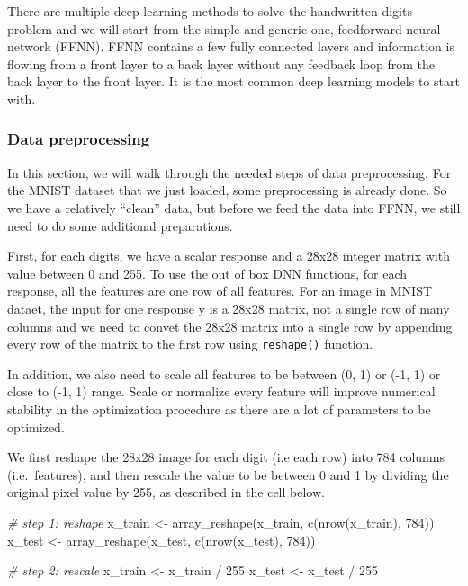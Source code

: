 \documentclass[
  12pt,
]{krantz}
\makeatletter
\newenvironment{Shaded}{\begin{snugshade}}{\end{snugshade}}
\newcommand{\CommentTok}[1]{\textcolor[rgb]{0.37,0.37,0.37}{\textit{#1}}}
\newcommand{\DecValTok}[1]{\textcolor[rgb]{0.06,0.06,0.06}{#1}}
\newcommand{\FunctionTok}[1]{\textcolor[rgb]{0,0,0}{#1}}
\newcommand{\NormalTok}[1]{#1}
\newcommand{\OtherTok}[1]{\textcolor[rgb]{0.37,0.37,0.37}{#1}}
\newcommand{\SpecialCharTok}[1]{\textcolor[rgb]{0,0,0}{#1}}
\newenvironment{kframe}{%
\medskip{}
\setlength{\fboxsep}{.8em}
 \def\at@end@of@kframe{}%
 \ifinner\ifhmode%
  \def\at@end@of@kframe{\end{minipage}}%
  \begin{minipage}{\columnwidth}%
 \fi\fi%
 \def\FrameCommand##1{\hskip\@totalleftmargin \hskip-\fboxsep
 \colorbox{shadecolor}{##1}\hskip-\fboxsep
     \hskip-\linewidth \hskip-\@totalleftmargin \hskip\columnwidth}%
 \MakeFramed {\advance\hsize-\width
   \@totalleftmargin\z@ \linewidth\hsize
   \@setminipage}}%
 {\par\unskip\endMakeFramed%
 \at@end@of@kframe}
\renewenvironment{Shaded}{\begin{kframe}}{\end{kframe}}
\makeatother
\begin{document}
There are multiple deep learning methods to solve the handwritten digits problem and we will start from the simple and generic one, feedforward neural network (FFNN). FFNN contains a few fully connected layers and information is flowing from a front layer to a back layer without any feedback loop from the back layer to the front layer. It is the most common deep learning models to start with.

\hypertarget{data-preprocessing}{%
\subsubsection{Data preprocessing}\label{data-preprocessing}}

In this section, we will walk through the needed steps of data preprocessing. For the MNIST dataset that we just loaded, some preprocessing is already done. So we have a relatively ``clean'' data, but before we feed the data into FFNN, we still need to do some additional preparations.

First, for each digits, we have a scalar response and a 28x28 integer matrix with value between 0 and 255. To use the out of box DNN functions, for each response, all the features are one row of all features. For an image in MNIST dataet, the input for one response y is a 28x28 matrix, not a single row of many columns and we need to convet the 28x28 matrix into a single row by appending every row of the matrix to the first row using \texttt{reshape()} function.

In addition, we also need to scale all features to be between (0, 1) or (-1, 1) or close to (-1, 1) range. Scale or normalize every feature will improve numerical stability in the optimization procedure as there are a lot of parameters to be optimized.

We first reshape the 28x28 image for each digit (i.e each row) into 784 columns (i.e.~features), and then rescale the value to be between 0 and 1 by dividing the original pixel value by 255, as described in the cell below.

\begin{Shaded}
\begin{Highlighting}[]
\CommentTok{\# step 1: reshape}
\NormalTok{x\_train }\OtherTok{\textless{}{-}} \FunctionTok{array\_reshape}\NormalTok{(x\_train,}
                         \FunctionTok{c}\NormalTok{(}\FunctionTok{nrow}\NormalTok{(x\_train), }\DecValTok{784}\NormalTok{))}
\NormalTok{x\_test }\OtherTok{\textless{}{-}} \FunctionTok{array\_reshape}\NormalTok{(x\_test,}
                        \FunctionTok{c}\NormalTok{(}\FunctionTok{nrow}\NormalTok{(x\_test), }\DecValTok{784}\NormalTok{))}

\CommentTok{\# step 2: rescale}
\NormalTok{x\_train }\OtherTok{\textless{}{-}}\NormalTok{ x\_train }\SpecialCharTok{/} \DecValTok{255}
\NormalTok{x\_test }\OtherTok{\textless{}{-}}\NormalTok{ x\_test }\SpecialCharTok{/} \DecValTok{255}
\end{Highlighting}
\end{Shaded}
\end{document}
